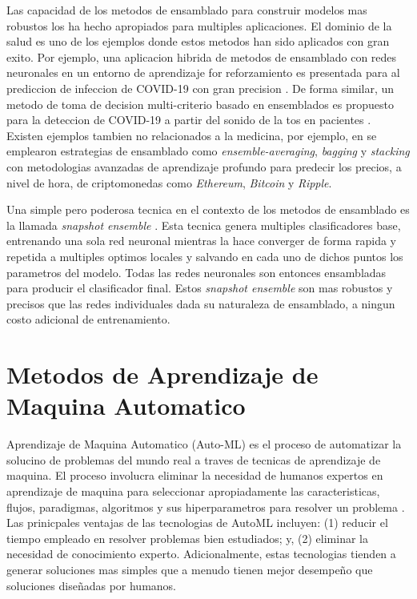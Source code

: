 Las capacidad de los metodos de ensamblado para construir modelos mas robustos los ha hecho apropiados para multiples aplicaciones. El dominio de la salud es uno de los ejemplos donde estos metodos han sido aplicados con gran exito. Por ejemplo, una aplicacion hibrida de metodos de ensamblado con redes neuronales en un entorno de aprendizaje for reforzamiento es presentada para al prediccion de infeccion de COVID-19 con gran precision \cite{JIN2022105560}. De forma similar, un metodo de toma de decision multi-criterio basado en ensemblados es propuesto para la deteccion de COVID-19 a partir del sonido de la tos en pacientes \cite{CHOWDHURY2022105405}. Existen ejemplos tambien no relacionados a la medicina, por ejemplo, en \cite{livieris2020ensemble} se emplearon estrategias de ensamblado como \textit{ensemble-averaging}, \textit{bagging} y \textit{stacking} con metodologias avanzadas de aprendizaje profundo para predecir los precios, a nivel de hora, de criptomonedas como \textit{Ethereum}, \textit{Bitcoin} y \textit{Ripple}.

Una simple pero poderosa tecnica en el contexto de los metodos de ensamblado es la llamada \textit{snapshot ensemble} \cite{huang17snapshot}. Esta tecnica genera multiples clasificadores base, entrenando una sola red neuronal mientras la hace converger de forma rapida y repetida a multiples optimos locales y salvando en cada uno de dichos puntos los parametros del modelo. Todas las redes neuronales son entonces ensambladas para producir el clasificador final. Estos \textit{snapshot ensemble} son mas robustos y precisos que las redes individuales dada su naturaleza de ensamblado, a ningun costo adicional de entrenamiento.

\section{Metodos de Aprendizaje de Maquina Automatico}\label{section:automl}

Aprendizaje de Maquina Automatico (Auto-ML) es el proceso de automatizar la solucino de problemas del mundo real a traves de tecnicas de aprendizaje de maquina. El proceso involucra eliminar la necesidad de humanos expertos en aprendizaje de maquina para seleccionar apropiadamente las caracteristicas, flujos, paradigmas, algoritmos y sus hiperparametros para resolver un problema \cite{Dimitrakakis_Liu_Parkes_Radanovic_2019}. Las prinicpales ventajas de las tecnologias de AutoML incluyen: (1) reducir el tiempo empleado en resolver problemas bien estudiados; y, (2) eliminar la necesidad de conocimiento experto. Adicionalmente, estas tecnologias tienden a generar soluciones mas simples que a menudo tienen mejor desempeño que soluciones diseñadas por humanos.

